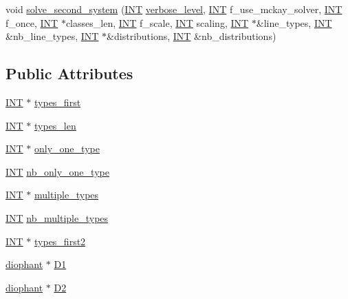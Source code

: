 \begin{DoxyCompactItemize}
void \mbox{\hyperlink{classtdo__data_af722419adafb1c21a5f2a5b9fbadb0e3}{solve\+\_\+second\+\_\+system}} (\mbox{\hyperlink{galois_8h_a09fddde158a3a20bd2dcadb609de11dc}{I\+NT}} \mbox{\hyperlink{simeon_8_c_a818073fbcc2f439e7c56952f67386122}{verbose\+\_\+level}}, \mbox{\hyperlink{galois_8h_a09fddde158a3a20bd2dcadb609de11dc}{I\+NT}} f\+\_\+use\+\_\+mckay\+\_\+solver, \mbox{\hyperlink{galois_8h_a09fddde158a3a20bd2dcadb609de11dc}{I\+NT}} f\+\_\+once, \mbox{\hyperlink{galois_8h_a09fddde158a3a20bd2dcadb609de11dc}{I\+NT}} $\ast$classes\+\_\+len, \mbox{\hyperlink{galois_8h_a09fddde158a3a20bd2dcadb609de11dc}{I\+NT}} f\+\_\+scale, \mbox{\hyperlink{galois_8h_a09fddde158a3a20bd2dcadb609de11dc}{I\+NT}} scaling, \mbox{\hyperlink{galois_8h_a09fddde158a3a20bd2dcadb609de11dc}{I\+NT}} $\ast$\&line\+\_\+types, \mbox{\hyperlink{galois_8h_a09fddde158a3a20bd2dcadb609de11dc}{I\+NT}} \&nb\+\_\+line\+\_\+types, \mbox{\hyperlink{galois_8h_a09fddde158a3a20bd2dcadb609de11dc}{I\+NT}} $\ast$\&distributions, \mbox{\hyperlink{galois_8h_a09fddde158a3a20bd2dcadb609de11dc}{I\+NT}} \&nb\+\_\+distributions)
\end{DoxyCompactItemize}
\subsection*{Public Attributes}
\begin{DoxyCompactItemize}
\item 
\mbox{\hyperlink{galois_8h_a09fddde158a3a20bd2dcadb609de11dc}{I\+NT}} $\ast$ \mbox{\hyperlink{classtdo__data_ad077fc7fc1ba955a8f4c2ebc3c1df912}{types\+\_\+first}}
\item 
\mbox{\hyperlink{galois_8h_a09fddde158a3a20bd2dcadb609de11dc}{I\+NT}} $\ast$ \mbox{\hyperlink{classtdo__data_a5069e5a316303b8354c17f1fe949d2a7}{types\+\_\+len}}
\item 
\mbox{\hyperlink{galois_8h_a09fddde158a3a20bd2dcadb609de11dc}{I\+NT}} $\ast$ \mbox{\hyperlink{classtdo__data_a724905bae1523e6cfa205a41aee7f6ec}{only\+\_\+one\+\_\+type}}
\item 
\mbox{\hyperlink{galois_8h_a09fddde158a3a20bd2dcadb609de11dc}{I\+NT}} \mbox{\hyperlink{classtdo__data_a99c95163f1024426a1c3e8457c470f50}{nb\+\_\+only\+\_\+one\+\_\+type}}
\item 
\mbox{\hyperlink{galois_8h_a09fddde158a3a20bd2dcadb609de11dc}{I\+NT}} $\ast$ \mbox{\hyperlink{classtdo__data_aa374e59220bc0855f66540547833b272}{multiple\+\_\+types}}
\item 
\mbox{\hyperlink{galois_8h_a09fddde158a3a20bd2dcadb609de11dc}{I\+NT}} \mbox{\hyperlink{classtdo__data_afd015fc9347e57ef9f22f8e2cf108171}{nb\+\_\+multiple\+\_\+types}}
\item 
\mbox{\hyperlink{galois_8h_a09fddde158a3a20bd2dcadb609de11dc}{I\+NT}} $\ast$ \mbox{\hyperlink{classtdo__data_a2892e18bd434f93b26e93e856a0e0269}{types\+\_\+first2}}
\item 
\mbox{\hyperlink{classdiophant}{diophant}} $\ast$ \mbox{\hyperlink{classtdo__data_abf12b65f913a5c714085f198989e0d45}{D1}}
\item 
\mbox{\hyperlink{classdiophant}{diophant}} $\ast$ \mbox{\hyperlink{classtdo__data_ab601e5c35bcbdece5398fac652883a3d}{D2}}
\end{DoxyCompactItemize}


